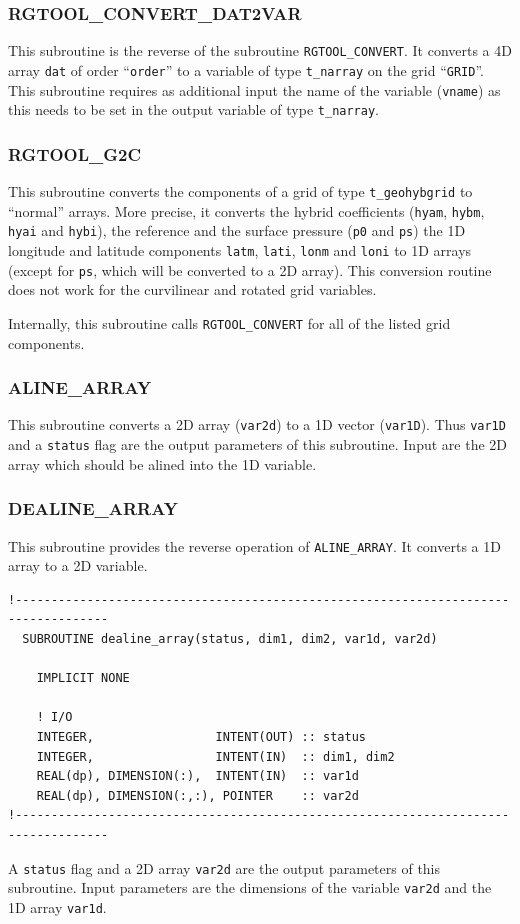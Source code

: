 \documentclass[11pt,twoside]{article}
\begin{document}
\subsubsection{RGTOOL\_CONVERT\_DAT2VAR\label{RGTCONVD2V}}
This subroutine is the reverse of the subroutine \verb|RGTOOL_CONVERT|. It 
converts a 4D array \verb|dat| of order ``\verb|order|'' to a variable
of type \verb|t_narray| on the grid ``\verb|GRID|''.
 This subroutine requires as additional input the name of the variable
 (\verb|vname|) as this needs to be set 
in the output variable of type \verb|t_narray|.

\subsubsection{RGTOOL\_G2C\label{RGTG2C}}
This subroutine converts the components of a grid of
type \verb|t_geohybgrid| to ``normal'' arrays.
More precise, it converts the hybrid
coefficients (\verb|hyam|, \verb|hybm|, \verb|hyai| and \verb|hybi|), the
reference and the surface pressure (\verb|p0| and \verb|ps|) the 1D
longitude and latitude components  \verb|latm|, \verb|lati|, \verb|lonm|
and \verb|loni| to 1D arrays (except for \verb|ps|, which will be
converted to a 2D array). This conversion routine does not
work for the curvilinear and rotated grid variables.

Internally, this subroutine calls \verb|RGTOOL_CONVERT| for all of the listed
grid components.

\subsubsection{ALINE\_ARRAY\label{ALARRAY}}
This subroutine converts a 2D array (\verb|var2d|) to a 1D
vector (\verb|var1D|). Thus \verb|var1D| and a \verb|status| flag are
the output parameters of this subroutine.
Input are the 2D array which should be alined into the 1D variable.

\subsubsection{DEALINE\_ARRAY\label{DEALARRAY}}
This subroutine provides the reverse operation of \verb|ALINE_ARRAY|.
It converts a 1D array to a 2D variable.
\begin{verbatim}
!-----------------------------------------------------------------------------------
  SUBROUTINE dealine_array(status, dim1, dim2, var1d, var2d)

    IMPLICIT NONE

    ! I/O
    INTEGER,                 INTENT(OUT) :: status
    INTEGER,                 INTENT(IN)  :: dim1, dim2
    REAL(dp), DIMENSION(:),  INTENT(IN)  :: var1d
    REAL(dp), DIMENSION(:,:), POINTER    :: var2d
!-----------------------------------------------------------------------------------
\end{verbatim}
A \verb|status| flag and a 2D array \verb|var2d| are the output
parameters of this subroutine.
Input parameters are the dimensions of the variable \verb|var2d| and
the 1D array \verb|var1d|.
\end{document}

